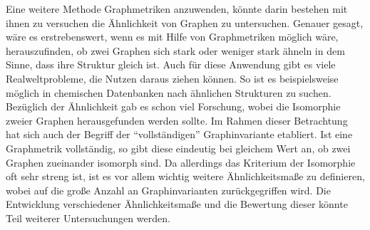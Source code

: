 \documentclass[a4paper,12pt,ngerman,chapterprefix=false,listof=totoc,bibliography=totoc]{scrreprt}
\begin{document}
{{{Eine weitere Methode Graphmetriken anzuwenden, könnte darin bestehen mit ihnen zu versuchen die Ähnlichkeit von Graphen zu untersuchen. Genauer gesagt, wäre es erstrebenswert, wenn es mit Hilfe von Graphmetriken möglich wäre, herauszufinden, ob zwei Graphen sich stark oder weniger stark ähneln in dem Sinne, dass ihre Struktur gleich ist. Auch für diese Anwendung gibt es viele Realweltprobleme, die Nutzen daraus ziehen können. So ist es beispielsweise möglich in chemischen Datenbanken nach ähnlichen Strukturen zu suchen. Bezüglich der Ähnlichkeit gab es schon viel Forschung, wobei die Isomorphie zweier Graphen herausgefunden werden sollte. Im Rahmen dieser Betrachtung hat sich auch der Begriff der "`vollständigen"' Graphinvariante etabliert. Ist eine Graphmetrik vollständig, so gibt diese eindeutig bei gleichem Wert an, ob zwei Graphen zueinander isomorph sind. Da allerdings das Kriterium der Isomorphie oft sehr streng ist, ist es vor allem wichtig weitere Ähnlichkeitsmaße zu definieren, wobei auf die große Anzahl an Graphinvarianten zurückgegriffen wird. Die Entwicklung verschiedener Ähnlichkeitsmaße und die Bewertung dieser könnte Teil weiterer Untersuchungen werden. \cite{dehmer_computational_2014,zager_graph_2008}
}
}}
\end{document}
